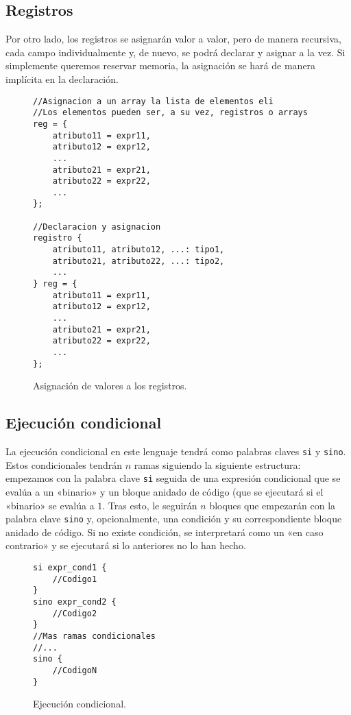 \subsection*{Registros}
Por otro lado, los registros se asignarán valor a valor, pero de manera
recursiva, cada campo individualmente y, de nuevo, se podrá declarar y asignar a
la vez. Si simplemente queremos reservar memoria, la asignación se hará de
manera implícita en la declaración.
\begin{figure}[H]
    \centering
    \begin{lstlisting}
//Asignacion a un array la lista de elementos eli
//Los elementos pueden ser, a su vez, registros o arrays
reg = {
    atributo11 = expr11,
    atributo12 = expr12,
    ...
    atributo21 = expr21,
    atributo22 = expr22,
    ...
};

//Declaracion y asignacion
registro {
    atributo11, atributo12, ...: tipo1,
    atributo21, atributo22, ...: tipo2,
    ...
} reg = {
    atributo11 = expr11,
    atributo12 = expr12,
    ...
    atributo21 = expr21,
    atributo22 = expr22,
    ...
};
    \end{lstlisting}
    \caption{Asignación de valores a los registros.}
\end{figure}

\subsection*{Ejecución condicional}
La ejecución condicional en este lenguaje tendrá como palabras claves \lstinline{si} y
\lstinline{sino}. Estos condicionales tendrán $n$ ramas siguiendo la siguiente estructura:
empezamos con la palabra clave \lstinline{si} seguida de una expresión condicional que se
evalúa a un «binario» y un bloque anidado de código (que se ejecutará si el
«binario» se evalúa a $1$. Tras esto, le seguirán $n$ bloques que empezarán con
la palabra clave \lstinline{sino} y, opcionalmente, una condición y su correspondiente
bloque anidado de código. Si no existe condición, se interpretará como un «en
caso contrario» y se ejecutará si lo anteriores no lo han hecho.
\begin{figure}[H]
    \centering
    \begin{lstlisting}
si expr_cond1 {
    //Codigo1
}
sino expr_cond2 {
    //Codigo2
} 
//Mas ramas condicionales
//...
sino {
    //CodigoN
}
    \end{lstlisting}
    \caption{Ejecución condicional.}
\end{figure}


